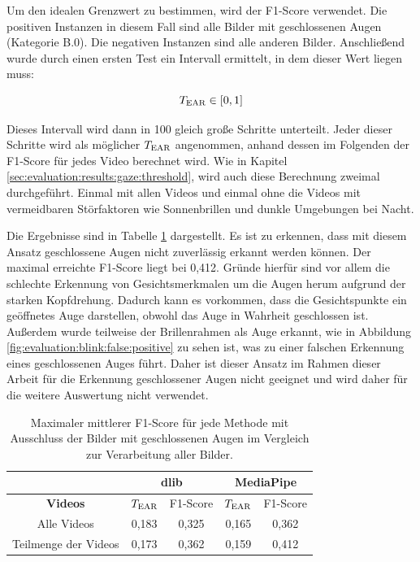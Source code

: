 Um den idealen Grenzwert zu bestimmen, wird der F1-Score verwendet. Die positiven Instanzen in diesem Fall sind alle Bilder mit geschlossenen Augen (Kategorie B.0). Die negativen Instanzen sind alle anderen Bilder. Anschließend wurde durch einen ersten Test ein Intervall ermittelt, in dem dieser Wert liegen muss:

\[
T_{\text{EAR}} \in [0, 1]
\]

Dieses Intervall wird dann in 100 gleich große Schritte unterteilt. Jeder dieser Schritte wird als möglicher $T_{\text{EAR}}$ angenommen, anhand dessen im Folgenden der F1-Score für jedes Video berechnet wird. Wie in Kapitel \ref{sec:evaluation:results:gaze:threshold}, wird auch diese Berechnung zweimal durchgeführt. Einmal mit allen Videos und einmal ohne die Videos mit vermeidbaren Störfaktoren wie Sonnenbrillen und dunkle Umgebungen bei Nacht. 

Die Ergebnisse sind in Tabelle \ref{tab:evaluation:ear} dargestellt. Es ist zu erkennen, dass mit diesem Ansatz geschlossene Augen nicht zuverlässig erkannt werden können. Der maximal erreichte F1-Score liegt bei 0,412. Gründe hierfür sind vor allem die schlechte Erkennung von Gesichtsmerkmalen um die Augen herum aufgrund der starken Kopfdrehung. Dadurch kann es vorkommen, dass die Gesichtspunkte ein geöffnetes Auge darstellen, obwohl das Auge in Wahrheit geschlossen ist. Außerdem wurde teilweise der Brillenrahmen als Auge erkannt, wie in Abbildung \ref{fig:evaluation:blink:false:positive} zu sehen ist, was zu einer falschen Erkennung eines geschlossenen Auges führt. Daher ist dieser Ansatz im Rahmen dieser Arbeit für die Erkennung geschlossener Augen nicht geeignet und wird daher für die weitere Auswertung nicht verwendet.

\begin{table}[]
    \centering
    \begin{tabular}{c | c c | c c}
        \toprule
        & \multicolumn{2}{c|}{\textbf{dlib}} &\multicolumn{2}{c}{\textbf{MediaPipe}} \\
        \midrule
        \textbf{Videos} & $T_{\text{EAR}}$ & F1-Score & $T_{\text{EAR}}$ & F1-Score \\
        \midrule
        Alle Videos & 0,183 & 0,325 & 0,165 & 0,362 \\
        Teilmenge der Videos & 0,173 & 0,362 & 0,159 & 0,412  \\
        \bottomrule
    \end{tabular}
    \caption{Maximaler mittlerer F1-Score für jede Methode mit Ausschluss der Bilder mit geschlossenen Augen im Vergleich zur Verarbeitung aller Bilder.}
    \label{tab:evaluation:ear}
\end{table}

